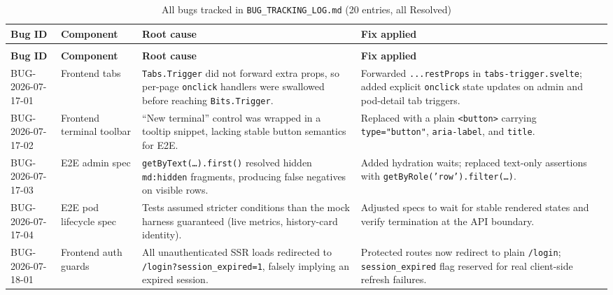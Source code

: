 \documentclass[12pt,a4paper]{article}
\begin{document}
\begin{center}
\footnotesize
\renewcommand{\arraystretch}{1.25}
\setlength{\tabcolsep}{2pt}
\begin{longtable}{|>{\RaggedRight\arraybackslash}p{1.9cm}|>{\RaggedRight\arraybackslash}p{2.0cm}|>{\RaggedRight\arraybackslash}p{3.9cm}|>{\RaggedRight\arraybackslash}p{3.8cm}|}
\caption{All bugs tracked in \texttt{BUG\_TRACKING\_LOG.md} (20 entries, all Resolved)}
\label{tab:bugs}\\
\hline
\textbf{Bug ID} & \textbf{Component} & \textbf{Root cause} & \textbf{Fix applied} \\
\hline
\endfirsthead
\multicolumn{4}{l}{\footnotesize\textit{Table~\ref{tab:bugs} continued}}\\
\hline
\textbf{Bug ID} & \textbf{Component} & \textbf{Root cause} & \textbf{Fix applied} \\
\hline
\endhead
\hline
\endfoot

BUG-2026-07-17-01 &
  Frontend tabs &
  \texttt{Tabs.Trigger} did not forward extra props, so per-page \texttt{onclick} handlers were swallowed before reaching \texttt{Bits.Trigger}. &
  Forwarded \texttt{...restProps} in \texttt{tabs-trigger.svelte}; added explicit \texttt{onclick} state updates on admin and pod-detail tab triggers. \\
\hline

BUG-2026-07-17-02 &
  Frontend terminal toolbar &
  ``New terminal'' control was wrapped in a tooltip snippet, lacking stable button semantics for E2E. &
  Replaced with a plain \texttt{<button>} carrying \texttt{type="button"}, \texttt{aria-label}, and \texttt{title}. \\
\hline

BUG-2026-07-17-03 &
  E2E admin spec &
  \texttt{getByText(\ldots).first()} resolved hidden \texttt{md:hidden} fragments, producing false negatives on visible rows. &
  Added hydration waits; replaced text-only assertions with \texttt{getByRole('row').filter(\ldots)}. \\
\hline

BUG-2026-07-17-04 &
  E2E pod lifecycle spec &
  Tests assumed stricter conditions than the mock harness guaranteed (live metrics, history-card identity). &
  Adjusted specs to wait for stable rendered states and verify termination at the API boundary. \\
\hline

BUG-2026-07-18-01 &
  Frontend auth guards &
  All unauthenticated SSR loads redirected to \texttt{/login?session\_expired=1}, falsely implying an expired session. &
  Protected routes now redirect to plain \texttt{/login}; \texttt{session\_expired} flag reserved for real client-side refresh failures. \\
\hline


\end{longtable}
\end{center}
\end{document}
